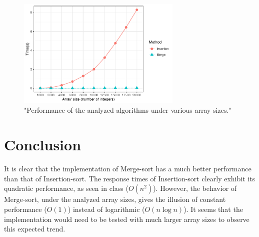 \documentclass[11pt]{article}
\begin{document}
\inputminted[linenos]{python}{array_generator.py}
\label{cod:array}

\begin{figure}[t]
    \centering
    \includegraphics[width=0.7\textwidth]{sort}
    \caption{"Performance of the analyzed algorithms under various array sizes."}
    \label{fig:sort}
\end{figure}

\section{Conclusion}
It is clear that the implementation of Merge-sort has a much better performance than that of Insertion-sort. The response times of Insertion-sort clearly exhibit its quadratic performance, as seen in class ($O(n^2)$). However, the behavior of Merge-sort, under the analyzed array sizes, gives the illusion of constant performance ($O(1)$) instead of logarithmic ($O(n \log n)$). It seems that the implementation would need to be tested with much larger array sizes to observe this expected trend.
\end{document}
